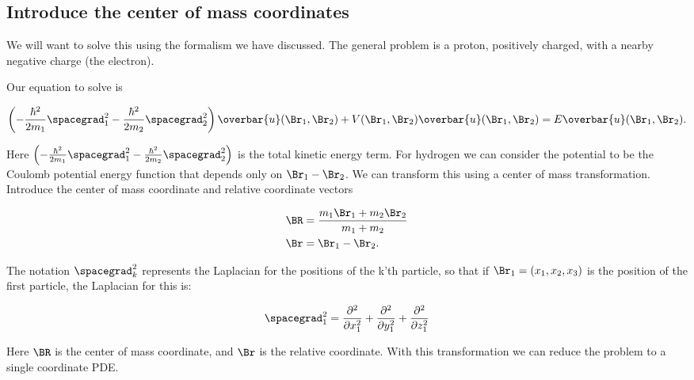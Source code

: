 %
%

\subsection{Introduce the center of mass coordinates}

We will want to solve this using the formalism we have discussed.  The general problem is a proton, positively charged, with a nearby negative charge (the electron).

Our equation to solve is

\begin{align}\label{eqn:PHY356Lecture10:50}
\left(
-\frac{\hbar^2}{2 m_1} \spacegrad_1^2
-\frac{\hbar^2}{2 m_2} \spacegrad_2^2
\right)
\overbar{u}(\Br_1, \Br_2) +
V(\Br_1, \Br_2)
\overbar{u}(\Br_1, \Br_2)
=
E \overbar{u}(\Br_1, \Br_2).
\end{align}

Here $\left( -\frac{\hbar^2}{2 m_1} \spacegrad_1^2 -\frac{\hbar^2}{2 m_2} \spacegrad_2^2 \right)$ is the total kinetic energy term.
For hydrogen we can consider the potential to be the Coulomb potential energy function that depends only on $\Br_1 - \Br_2$.  We can transform this using a center of mass transformation.  Introduce the center of mass coordinate and relative coordinate vectors

\begin{align}\label{eqn:PHY356Lecture10:51}
\BR &= \frac{m_1 \Br_1 + m_2 \Br_2}{ m_1 + m_2 } \\
\Br &= \Br_1 - \Br_2.
\end{align}

The notation $\spacegrad_k^2$ represents the Laplacian for the positions of the k'th particle, so that if $\Br_1 = (x_1, x_2, x_3)$ is the position of the first particle, the Laplacian for this is:

\begin{equation}\label{eqn:PHY356FLecture10:52}
\spacegrad_1^2
=
\frac{\partial^2}{\partial x_1^2}
+\frac{\partial^2}{\partial y_1^2}
+\frac{\partial^2}{\partial z_1^2}
\end{equation}

Here $\BR$ is the center of mass coordinate, and $\Br$ is the relative coordinate.  With this transformation we can reduce the problem to a single coordinate PDE.

